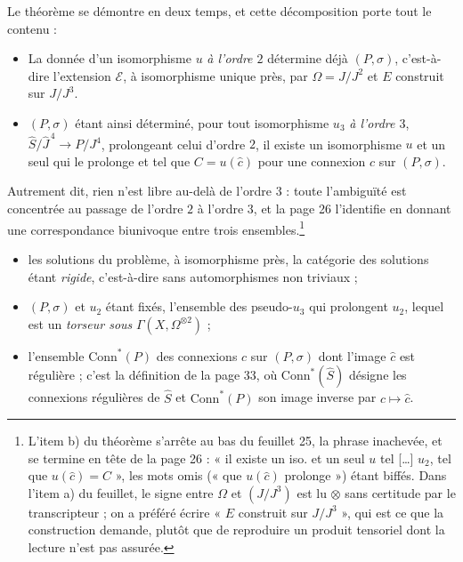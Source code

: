 \documentclass[11pt,a4paper]{article}
\begin{document}
Le théorème se démontre en deux temps, et cette décomposition porte
tout le contenu :

\begin{itemize}
\item[a)] La donnée d'un isomorphisme $u$ \emph{à l'ordre $2$} détermine déjà
$(P,\sigma)$, c'est-à-dire l'extension $\mathcal{E}$, à isomorphisme unique
près, par $\Omega = J/J^2$ et $E$ construit sur $J/J^3$.
\item[b)] $(P,\sigma)$ étant ainsi déterminé, pour tout isomorphisme $u_3$
\emph{à l'ordre $3$}, $\widehat{S}/\widehat{J}^{\,4} \to P/J^4$, prolongeant
celui d'ordre $2$, il existe un isomorphisme $u$ et un seul qui le prolonge et
tel que $C = u(\widehat{c})$ pour une connexion $c$ sur $(P,\sigma)$.
\end{itemize}

Autrement dit, rien n'est libre au-delà de l'ordre $3$ : toute l'ambiguïté est
concentrée au passage de l'ordre $2$ à l'ordre $3$, et la page 26 l'identifie
en donnant une correspondance biunivoque entre trois
ensembles.\footnote{L'item b) du théorème s'arrête au bas du feuillet 25, la
phrase inachevée, et se termine en tête de la page 26 : « il existe un iso. et
un seul $u$ tel [\ldots] $u_2$, tel que $u(\widehat{c}) = C$ », les mots
omis (« que $u(\widehat{c})$ prolonge ») étant biffés. Dans
l'item a) du feuillet, le signe entre $\Omega$ et $(J/J^3)$ est lu $\otimes$
sans certitude par le transcripteur ; on a préféré écrire « $E$ construit sur
$J/J^3$ », qui est ce que la construction demande, plutôt que de reproduire un
produit tensoriel dont la lecture n'est pas assurée.}

\begin{itemize}
\item[a)] les solutions du problème, à isomorphisme près, la catégorie des
solutions étant \emph{rigide}, c'est-à-dire sans automorphismes non triviaux ;
\item[b)] $(P,\sigma)$ et $u_2$ étant fixés, l'ensemble des
pseudo-$u_3$ qui prolongent $u_2$, lequel est un \emph{torseur sous}
$\Gamma(X, \Omega^{\otimes 2})$ ;
\item[c)] l'ensemble $\mathrm{Conn}^*(P)$ des connexions $c$ sur
$(P,\sigma)$ dont l'image $\widehat{c}$ est régulière ; c'est la définition de
la page 33, où $\mathrm{Conn}^*(\widehat{S})$ désigne les connexions
régulières de $\widehat{S}$ et $\mathrm{Conn}^*(P)$ son image inverse par
$c \mapsto \widehat{c}$.
\end{itemize}
\end{document}
